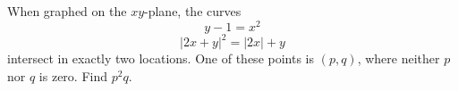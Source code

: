 When graphed on the $xy$-plane, the curves \[y - 1 = x^2\]\[|2x + y|^2 = |2x| + y\]intersect in exactly two locations. One of these points is $(p, q)$, where neither $p$ nor $q$ is zero. Find $p^2q$.
